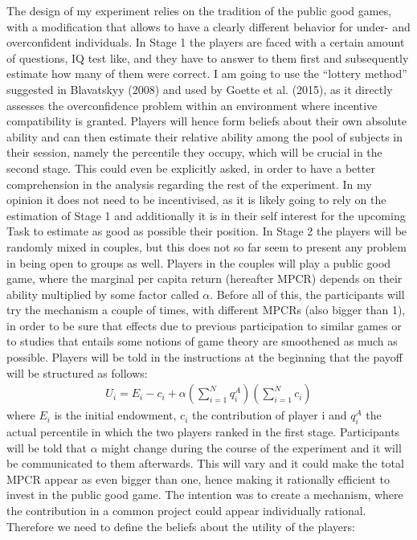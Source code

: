 \documentclass[11pt,twoside,a4paper,leqno]{article}
\begin{document}
The design of my experiment relies on the tradition of the public good games, with a modification that allows to have a clearly different behavior for under- and overconfident individuals. In Stage 1 the players are faced with a certain amount of questions, IQ test like, and they have to answer to them first and subsequently estimate how many of them were correct. I am going to use the “lottery method” suggested in Blavatskyy (2008)\textsuperscript{\cite{Blav}} and used by Goette et al. (2015)\textsuperscript{\cite{Goette}}, as it directly assesses the overconfidence problem within an environment where incentive compatibility is granted. Players will hence form beliefs about their own absolute ability and can then estimate their relative ability among the pool of subjects in their session, namely the percentile they occupy, which will be crucial in the second stage. This could even be explicitly asked, in order to have a better comprehension in the analysis regarding the rest of the experiment. In my opinion it does not need to be incentivised, as it is likely going to rely on the estimation of Stage 1 and additionally it is in their self interest for the upcoming Task to estimate as good as possible their position. \newline
In Stage 2 the players will be randomly mixed in couples, but this does not so far seem to present any problem in being open to groups as well. Players in the couples will play a public good game, where the marginal per capita return (hereafter MPCR) depends on their ability multiplied by some factor called $\alpha$. Before all of this, the participants will try the mechanism a couple of times, with different MPCRs (also bigger than 1), in order to be sure that effects due to previous participation to similar games or to studies that entails some notions of game theory are smoothened as much as possible. 
Players will be told in the instructions at the beginning that the payoff will be structured as follows:
\begin{align}
	U_{i} = E_{i} - c_{i} + \alpha(\sum_{i=1}^N q_{i}^A)(\sum_{i=1}^N c_{i})
\end{align}
where $E_{i}$ is the initial endowment, $c_{i}$ the contribution of player i and $q_{i}^A$ the actual percentile in which the two players ranked in the first stage. Participants will be told that $\alpha$ might change during the course of the experiment and it will be communicated to them afterwards. This will vary and it could make the total MPCR appear as even bigger than one, hence making it rationally efficient to invest in the public good game. The intention was to create a mechanism, where the contribution in a common project could appear individually rational. Therefore we need to define the beliefs about the utility of the players:
\end{document}
